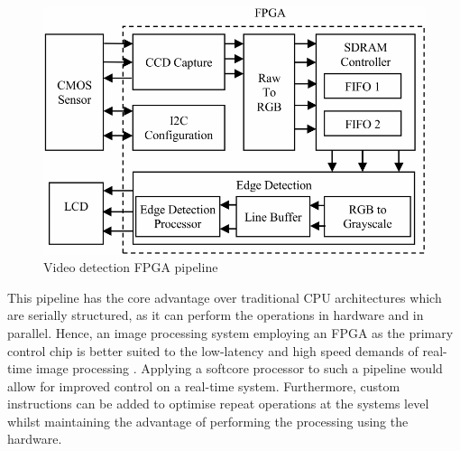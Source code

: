 \begin{figure}[h]
    \centering
    \includegraphics[width=1\textwidth]{Assets/Gradient.png}
    \caption{Video detection FPGA pipeline \cite{Gradient}}
    \label{fig:gradient}
\end{figure}


This pipeline has the core advantage over traditional CPU architectures which are serially structured, as it can perform the operations in hardware and in parallel. 
Hence, an image processing system employing an FPGA as the primary control chip is better suited to the low-latency and high speed demands of real-time image processing \cite{RTEdge}.
Applying a softcore processor to such a pipeline would allow for improved control on a real-time system. 
Furthermore, custom instructions can be added to optimise repeat operations at the systems level whilst maintaining the advantage of performing the processing using the hardware.